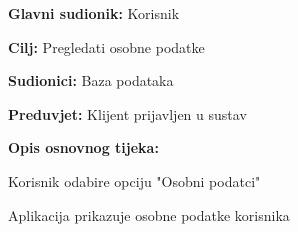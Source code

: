 					\noindent {}
					\begin{packed_item}
	
						\item \textbf{Glavni sudionik: }Korisnik
						\item  \textbf{Cilj:} Pregledati osobne podatke
						\item  \textbf{Sudionici:} Baza podataka
						\item  \textbf{Preduvjet:} Klijent prijavljen u sustav
						\item  \textbf{Opis osnovnog tijeka:}
						
						\item[] \begin{packed_enum}
	
							\item Korisnik odabire opciju "Osobni podatci"
							\item Aplikacija prikazuje osobne podatke korisnika
						\end{packed_enum}
						
					\end{packed_item}
					
					
					
